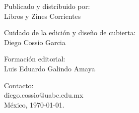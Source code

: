 

\begin{flushleft}
    \thispagestyle{empty}     %
    \addtocounter{page}{-1}   %
    
    \vspace*{\fill} 
    
    \scriptsize{
        Publicado y distribuido por: \\
        Libros y Zines Corrientes \\
        \vspace{0.25in}
        
        Cuidado de la edición y diseño de cubierta: \\
        Diego Cossio Garcia \\ 
        \vspace{0.25in}
        
        Formación editorial: \\
        Luis Eduardo Galindo Amaya \\ 
        \vspace{0.25in}
        
        Contacto: \\
        diego.cossio@uabc.edu.mx \\ 
        México, \today.
    }

\end{flushleft}